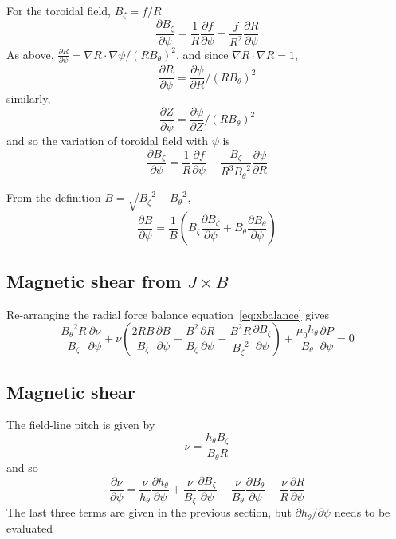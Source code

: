 \documentclass[12pt, a4paper]{article}
\newcommand{\deriv}[2]{\ensuremath{\frac{\partial #1}{\partial #2}}}
\newcommand{\hthe}{\ensuremath{h_\theta}}
\newcommand{\Bp}{\ensuremath{B_\theta}}
\newcommand{\Bt}{\ensuremath{B_\zeta}}
\begin{document}
For the toroidal field, $\Bt = f/R$
\[
\deriv{\Bt}{\psi} = \frac{1}{R}\deriv{f}{\psi} - \frac{f}{R^2}\deriv{R}{\psi}
\]
As above, $\deriv{R}{\psi} = \nabla R \cdot\nabla\psi / \left(R\Bp\right)^2$,
and since $\nabla R\cdot\nabla R = 1$,
\[
\deriv{R}{\psi} = \deriv{\psi}{R} / \left(R\Bp\right)^2
\]
similarly,
\[
\deriv{Z}{\psi} = \deriv{\psi}{Z} / \left(R\Bp\right)^2
\]
and so the variation of toroidal field with $\psi$ is
\[
\deriv{\Bt}{\psi} = \frac{1}{R}\deriv{f}{\psi} - \frac{\Bt}{R^3\Bp^2}\deriv{\psi}{R}
\]

From the definition $B=\sqrt{\Bt^2 + \Bp^2}$, 
\[
\deriv{B}{\psi} = \frac{1}{B}\left(\Bt\deriv{\Bt}{\psi} + \Bp\deriv{\Bp}{\psi}\right)
\]

\subsection{Magnetic shear from $J\times B$}

Re-arranging the radial force balance equation~\ref{eq:xbalance} gives
\[
\frac{\Bp^2R}{\Bt}\deriv{\nu}{\psi} + \nu\left(\frac{2RB}{\Bt}\deriv{B}{\psi} + \frac{B^2}{\Bt}\deriv{R}{\psi} - \frac{B^2R}{\Bt^2}\deriv{\Bt}{\psi}\right) + \frac{\mu_0\hthe}{\Bp}\deriv{P}{\psi} = 0
\]

\subsection{Magnetic shear}

The field-line pitch is given by
\[
\nu = \frac{\hthe\Bt}{\Bp R}
\]
and so
\[
\deriv{\nu}{\psi} = \frac{\nu}{\hthe}\deriv{\hthe}{\psi} + \frac{\nu}{\Bt}\deriv{\Bt}{\psi} - \frac{\nu}{\Bp}\deriv{\Bp}{\psi} - \frac{\nu}{R}\deriv{R}{\psi}
\]
The last three terms are given in the previous section, but $\partial\hthe/\partial\psi$ needs to be evaluated
\end{document}
